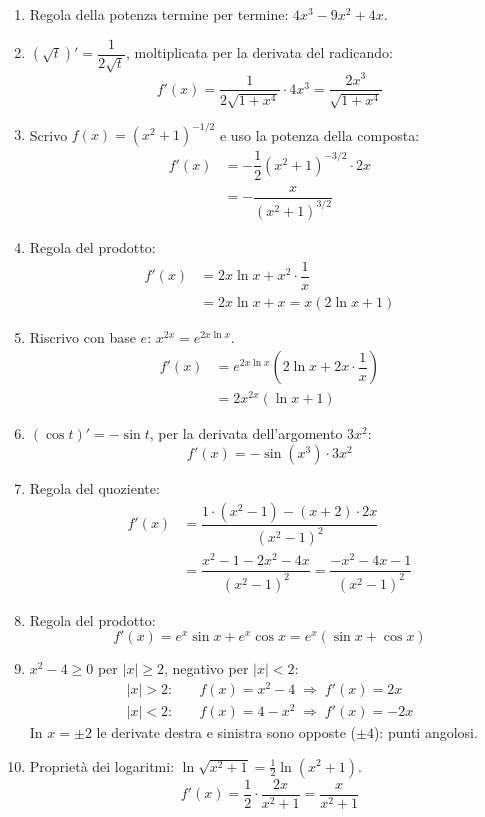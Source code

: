 \begin{question}[ID=1.2, subtitle={Calcolo di derivate — serie 2}, tags={derivate, calcolo}, difficulty=media]
\begin{explanation}
\begin{enumerate}[label=\arabic*)]
    \item Regola della potenza termine per termine: $4x^3-9x^2+4x$.
    \item $(\sqrt t)'=\dfrac{1}{2\sqrt t}$, moltiplicata per la derivata del radicando:
    \[ f'(x)=\dfrac{1}{2\sqrt{1+x^4}}\cdot4x^3=\dfrac{2x^3}{\sqrt{1+x^4}} \]
    \item Scrivo $f(x)=(x^2+1)^{-1/2}$ e uso la potenza della composta:
    \[\begin{aligned}
    f'(x) &= -\dfrac12(x^2+1)^{-3/2}\cdot2x\\
    &= -\dfrac{x}{(x^2+1)^{3/2}}
    \end{aligned}\]
    \item Regola del prodotto:
    \[\begin{aligned}
    f'(x) &= 2x\ln x+x^2\cdot\dfrac1x\\
    &= 2x\ln x+x=x(2\ln x+1)
    \end{aligned}\]
    \item Riscrivo con base $e$: $x^{2x}=e^{2x\ln x}$.
    \[\begin{aligned}
    f'(x) &= e^{2x\ln x}\left(2\ln x+2x\cdot\dfrac1x\right)\\
    &= 2x^{2x}(\ln x+1)
    \end{aligned}\]
    \item $(\cos t)'=-\sin t$, per la derivata dell'argomento $3x^2$:
    \[ f'(x)=-\sin(x^3)\cdot3x^2 \]
    \item Regola del quoziente:
    \[\begin{aligned}
    f'(x) &= \dfrac{1\cdot(x^2-1)-(x+2)\cdot2x}{(x^2-1)^2}\\
    &= \dfrac{x^2-1-2x^2-4x}{(x^2-1)^2}=\dfrac{-x^2-4x-1}{(x^2-1)^2}
    \end{aligned}\]
    \item Regola del prodotto:
    \[ f'(x)=e^x\sin x+e^x\cos x=e^x(\sin x+\cos x) \]
    \item $x^2-4\geq0$ per $|x|\geq2$, negativo per $|x|<2$:
    \[\begin{aligned}
    |x|>2: &\quad f(x)=x^2-4 \;\Rightarrow\; f'(x)=2x\\
    |x|<2: &\quad f(x)=4-x^2 \;\Rightarrow\; f'(x)=-2x
    \end{aligned}\]
    In $x=\pm2$ le derivate destra e sinistra sono opposte ($\pm4$): punti angolosi.
    \item Proprietà dei logaritmi: $\ln\sqrt{x^2+1}=\tfrac12\ln(x^2+1)$.
    \[ f'(x)=\dfrac12\cdot\dfrac{2x}{x^2+1}=\dfrac{x}{x^2+1} \]
\end{enumerate}
\end{explanation}
\end{question}


